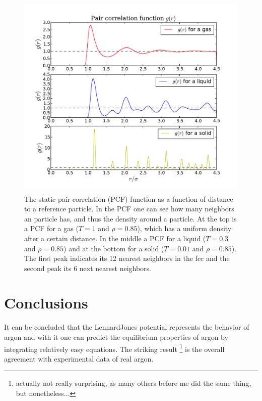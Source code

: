 \documentclass{article}
\begin{document}
\begin{figure}[htbp]
  \centering
    \includegraphics[height=100mm]{pcf.pdf}
  \caption[]{The static pair correlation (PCF) function as a function of distance to a reference particle. In the PCF one can see how many neighbors an particle has, and thus the density around a particle. At the top is a PCF for a gas ($T=1$ and $\rho=0.85$), which has a uniform density after a certain distance. In the middle a PCF for a liquid ($T=0.3$ and $\rho=0.85$) and at the bottom for a solid ($T=0.01$ and $\rho=0.85$). The first peak indicates its 12 nearest neighbors in the fcc and the second peak its 6 next nearest neighbors.}
  \label{fig:pcf}
\end{figure}


\section{Conclusions}
It can be concluded that the Lennard\text{-}Jones potential represents the behavior of argon and with it one can predict the equilibrium properties of argon by integrating relatively easy equations. The striking result \footnote{actually not really surprising, as many others before me did the same thing, but nonetheless...} is the over\text{-}all agreement with experimental data of real argon. 

{}

\end{document}
